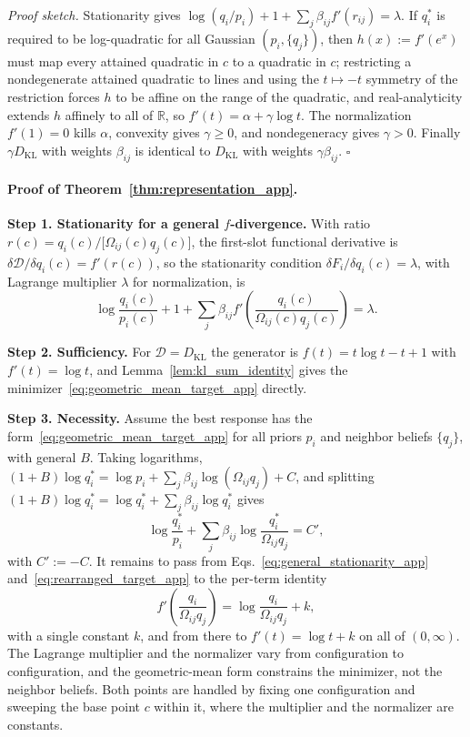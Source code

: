 \documentclass[11pt]{article}
\begin{document}
\emph{Proof sketch.} Stationarity gives $\log(q_i/p_i) + 1 + \sum_j \beta_{ij} f'(r_{ij}) = \lambda$. If $q_i^*$ is required to be log-quadratic for all Gaussian $(p_i, \{q_j\})$, then $h(x) := f'(e^x)$ must map every attained quadratic in $c$ to a quadratic in $c$; restricting a nondegenerate attained quadratic to lines and using the $t \mapsto -t$ symmetry of the restriction forces $h$ to be affine on the range of the quadratic, and real-analyticity extends $h$ affinely to all of $\mathbb{R}$, so $f'(t) = \alpha + \gamma\log t$. The normalization $f'(1) = 0$ kills $\alpha$, convexity gives $\gamma \ge 0$, and nondegeneracy gives $\gamma > 0$. Finally $\gamma D_{\mathrm{KL}}$ with weights $\beta_{ij}$ is identical to $D_{\mathrm{KL}}$ with weights $\gamma\beta_{ij}$. \hfill $\square$

\paragraph{Proof of Theorem~\ref{thm:representation_app}.}

\textbf{Step 1. Stationarity for a general $f$-divergence.} With ratio $r(c)=q_i(c)/\bigl[\Omega_{ij}(c)q_j(c)\bigr]$, the first-slot functional derivative is $\delta\mathcal{D}/\delta q_i(c) = f'(r(c))$, so the stationarity condition $\delta F_i/\delta q_i(c)=\lambda$, with Lagrange multiplier $\lambda$ for normalization, is
\begin{equation}
\log\frac{q_i(c)}{p_i(c)} + 1
+ \sum_j \beta_{ij}f'\left(\frac{q_i(c)}{\Omega_{ij}(c)q_j(c)}\right) = \lambda.
\label{eq:general_stationarity_app}
\end{equation}

\textbf{Step 2. Sufficiency.} For $\mathcal{D}=D_{\mathrm{KL}}$ the generator is $f(t)=t\log t - t + 1$ with $f'(t)=\log t$, and Lemma~\ref{lem:kl_sum_identity} gives the minimizer~\eqref{eq:geometric_mean_target_app} directly.

\textbf{Step 3. Necessity.} Assume the best response has the form~\eqref{eq:geometric_mean_target_app} for all priors $p_i$ and neighbor beliefs $\{q_j\}$, with general $B$. Taking logarithms, $(1+B)\log q_i^* = \log p_i + \sum_j\beta_{ij}\log(\Omega_{ij}q_j) + C$, and splitting $(1+B)\log q_i^* = \log q_i^* + \sum_j\beta_{ij}\log q_i^*$ gives
\begin{equation}
\log\frac{q_i^*}{p_i} + \sum_j\beta_{ij}\log\frac{q_i^*}{\Omega_{ij}q_j} = C',
\label{eq:rearranged_target_app}
\end{equation}
with $C' := -C$. It remains to pass from Eqs.~\eqref{eq:general_stationarity_app} and~\eqref{eq:rearranged_target_app} to the per-term identity
\begin{equation}
f'\left(\frac{q_i}{\Omega_{ij}q_j}\right) = \log\frac{q_i}{\Omega_{ij}q_j} + k,
\label{eq:ode_app}
\end{equation}
with a single constant $k$, and from there to $f'(t) = \log t + k$ on all of $(0, \infty)$. The Lagrange multiplier and the normalizer vary from configuration to configuration, and the geometric-mean form constrains the minimizer, not the neighbor beliefs. Both points are handled by fixing one configuration and sweeping the base point $c$ within it, where the multiplier and the normalizer are constants.
\end{document}
